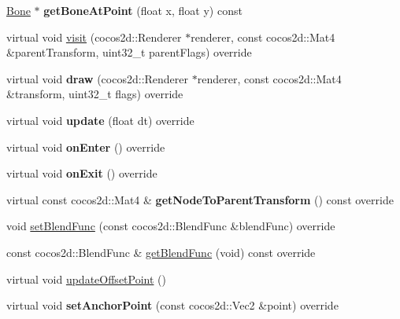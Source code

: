 \begin{DoxyCompactItemize}
\hyperlink{classcocostudio_1_1Bone}{Bone} $\ast$ {\bfseries get\+Bone\+At\+Point} (float x, float y) const
\item 
virtual void \hyperlink{classcocostudio_1_1Armature_a1937eec5f06a4d889d2a46612b027714}{visit} (cocos2d\+::\+Renderer $\ast$renderer, const cocos2d\+::\+Mat4 \&parent\+Transform, uint32\+\_\+t parent\+Flags) override
\item 
\mbox{\label{classcocostudio_1_1Armature_aee8a1edbefa706f6e6d71ab704b150ed}} 
virtual void {\bfseries draw} (cocos2d\+::\+Renderer $\ast$renderer, const cocos2d\+::\+Mat4 \&transform, uint32\+\_\+t flags) override
\item 
\mbox{\label{classcocostudio_1_1Armature_ac1b31c8f0d5582d00e9f44a367c93834}} 
virtual void {\bfseries update} (float dt) override
\item 
\mbox{\label{classcocostudio_1_1Armature_a7aaf0f1936090adf8cde3baa8ee3ccd4}} 
virtual void {\bfseries on\+Enter} () override
\item 
\mbox{\label{classcocostudio_1_1Armature_a0b9ccec3b7d718846ae91a1d0cb2feb3}} 
virtual void {\bfseries on\+Exit} () override
\item 
\mbox{\label{classcocostudio_1_1Armature_a0c3ad103261ea36a70fd2f20df693203}} 
virtual const cocos2d\+::\+Mat4 \& {\bfseries get\+Node\+To\+Parent\+Transform} () const override
\item 
void \hyperlink{classcocostudio_1_1Armature_a2adcf2445626fd9ebbc52923960c567c}{set\+Blend\+Func} (const cocos2d\+::\+Blend\+Func \&blend\+Func) override
\item 
const cocos2d\+::\+Blend\+Func \& \hyperlink{classcocostudio_1_1Armature_acd462bbd0dc9fec97bb2778a2ad13bfc}{get\+Blend\+Func} (void) const override
\item 
virtual void \hyperlink{classcocostudio_1_1Armature_a5108693264d1c398ab32fc70ba1bf059}{update\+Offset\+Point} ()
\item 
\mbox{\label{classcocostudio_1_1Armature_ad4af082dcf3d4b94cf5e151dd94f1063}} 
virtual void {\bfseries set\+Anchor\+Point} (const cocos2d\+::\+Vec2 \&point) override
\item 

\end{DoxyCompactItemize}
